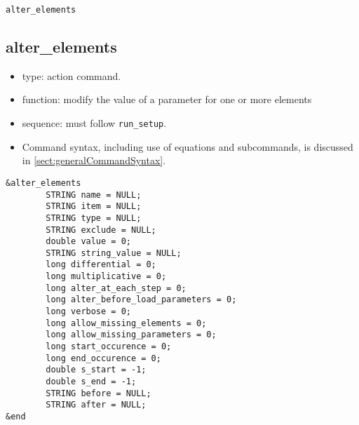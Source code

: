 \documentclass[11pt]{article}
\begin{document}
\clearpage

\newpage
\begin{center}{\Large\verb|alter_elements|}\end{center}
\subsection{alter\_elements\label{subsec:alterelements}}

\begin{itemize}
\item type: action command.
\item function: modify the value of a parameter for one or more elements
\item sequence: must follow \verb|run_setup|.
\item Command syntax, including use of equations and subcommands, is discussed in \ref{sect:generalCommandSyntax}.
\end{itemize}

\begin{verbatim}
&alter_elements
        STRING name = NULL;
        STRING item = NULL;
        STRING type = NULL;
        STRING exclude = NULL;
        double value = 0;
        STRING string_value = NULL;
        long differential = 0;
        long multiplicative = 0;
        long alter_at_each_step = 0;
        long alter_before_load_parameters = 0;
        long verbose = 0;
        long allow_missing_elements = 0;
        long allow_missing_parameters = 0;
        long start_occurence = 0;
        long end_occurence = 0;
        double s_start = -1;
        double s_end = -1;
        STRING before = NULL;
        STRING after = NULL;
&end
\end{verbatim}
\end{document}
